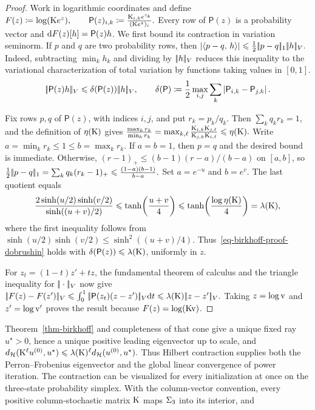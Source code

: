 \begin{proof}
Work in logarithmic coordinates and define
\(F(z)\coloneqq\log(\mathrm{K} e^z), \qquad \mathsf P(z)_{i,k} \coloneqq \frac{\mathrm{K}_{i,k}e^{z_k}}{(\mathrm{K} e^z)_i}.\)
Every row of $\mathsf P(z)$ is a probability vector and $\mathrm{d} F(z)[h]=\mathsf P(z)h$. We first bound its contraction in variation seminorm. If $p$ and $q$ are two probability rows, then
\(\left\lvert\langle p-q,\,h\rangle\right\rvert \leqslant \frac12|\!| p-q |\!|_1|\!| h |\!|_V.\)
Indeed, subtracting $\min_k h_k$ and dividing by $|\!| h |\!|_V$ reduces this inequality to the variational characterization of total variation by functions taking values in $[0,1]$.
\begin{equation}\label{eq-birkhoff-proof-dobrushin}
|\!| \mathsf P(z)h |\!|_V
\leqslant
\delta(\mathsf P(z))|\!| h |\!|_V,
\qquad
\delta(\mathsf P)
\coloneqq
\frac12\max_{i,j}\sum_k\left\lvert\mathsf P_{i,k}-\mathsf P_{j,k}\right\rvert.
\end{equation}

Fix rows $p,q$ of $\mathsf P(z)$, with indices $i,j$, and put $r_k=p_k/q_k$. Then $\sum_kq_kr_k=1$, and the definition of $\eta(\mathrm{K})$ gives
\(\frac{\max_k r_k}{\min_k r_k} = \max_{k,\ell} \frac{\mathrm{K}_{i,k}\mathrm{K}_{j,\ell}}{\mathrm{K}_{j,k}\mathrm{K}_{i,\ell}} \leqslant\eta(\mathrm{K}).\)
Write $a=\min_k r_k\leq1\leq b=\max_k r_k$. If $a=b=1$, then $p=q$ and the desired bound is immediate. Otherwise, $(r-1)_+\leq (b-1)(r-a)/(b-a)$ on $[a,b]$, so
\(\frac12|\!| p-q |\!|_1 = \sum_kq_k(r_k-1)_+ \leqslant \frac{(1-a)(b-1)}{b-a}.\)
Set $a=e^{-u}$ and $b=e^v$. The last quotient equals
\[
\frac{2\sinh(u/2)\sinh(v/2)}{\sinh((u+v)/2)}
\leqslant
\tanh\!\left(\frac{u+v}{4}\right)
\leqslant
\tanh\!\left(\frac{\log\eta(\mathrm{K})}{4}\right)
=
\lambda(\mathrm{K}),
\]
where the first inequality follows from $\sinh(u/2)\sinh(v/2)\leq\sinh^2((u+v)/4)$. Thus~\eqref{eq-birkhoff-proof-dobrushin} holds with $\delta(\mathsf P(z))\leqslant\lambda(\mathrm{K})$, uniformly in $z$.

For $z_t=(1-t)z'+tz$, the fundamental theorem of calculus and the triangle inequality for $|\!| \cdot |\!|_V$ now give
\(|\!| F(z)-F(z') |\!|_V \leqslant \int_0^1|\!| \mathsf P(z_t)(z-z') |\!|_V\mathrm{d} t \leqslant \lambda(\mathrm{K})|\!| z-z' |\!|_V.\)
Taking $z=\log\mathrm{v}$ and $z'=\log\mathrm{v}'$ proves the result because $F(z)=\log(\mathrm{K}\mathrm{v})$.
\end{proof}
Theorem~\ref{thm-birkhoff} and completeness of that cone give a unique fixed ray $u^\star>0$, hence a unique positive leading eigenvector up to scale, and
\(d_{\mathcal{H}}(\mathrm{K}^\ell u^{(0)},u^\star) \leqslant \lambda(\mathrm{K})^\ell d_{\mathcal{H}}(u^{(0)},u^\star).\)
Thus Hilbert contraction supplies both the Perron--Frobenius eigenvector and the global linear convergence of power iteration. The contraction can be visualized for every initialization at once on the three-state probability simplex. With the column-vector convention, every positive column-stochastic matrix $\mathrm{K}$ maps $\Sigma_3$ into its interior, and
